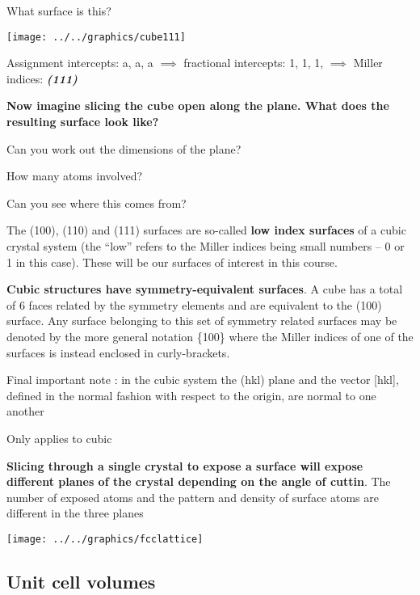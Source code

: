 \documentclass[ignorenonframetext]{beamer}
\begin{document}
\begin{example}{What surface is this?}\label{111}
\begin{frame}
\texttt{[image: ../../graphics/cube111]}
\end{frame}

Assignment intercepts: a, a, a \(\implies\) fractional intercepts: 1, 1, 1, \(\implies\) Miller indices: \textbf{\textit{(111)}}

{\bfseries Now imagine slicing the cube open along the plane. What does the resulting surface look like?

Can you work out the dimensions of the plane?

How many atoms involved?

Can you see where this comes from?}

\end{example}

The (100), (110) and (111) surfaces are so-called \textbf{low index surfaces} of a cubic crystal system (the ``low'' refers to the Miller indices being small numbers -- 0 or 1 in this case). These will be our surfaces of interest in this course.


\textbf{Cubic structures have symmetry-equivalent surfaces}. A cube has a total of 6 faces related by the symmetry elements and are equivalent to the (100) surface. Any surface belonging to this set of symmetry related surfaces may be denoted by the more general notation \{100\} where the Miller indices of one of the surfaces is instead enclosed in curly-brackets.

Final important note : in the cubic system the (hkl) plane and the vector [hkl], defined in the normal fashion with respect to the origin, are normal to one another

Only applies to cubic

\textbf{Slicing through a single crystal to expose a surface will expose different planes of the crystal depending on the angle of cuttin}. The number of exposed atoms and the pattern and density of surface atoms are different in the three planes

\begin{frame}\begin{center}\texttt{[image: ../../graphics/fcclattice]}\end{center}\end{frame}

\subsection{Unit cell volumes}
\end{document}
